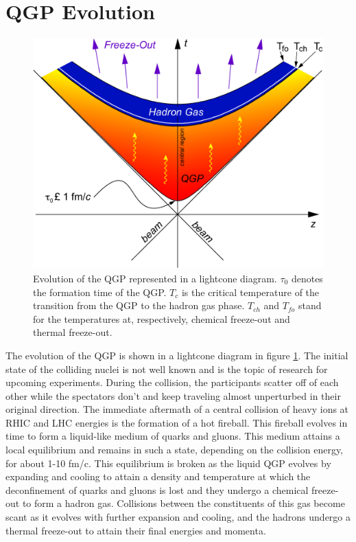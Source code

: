 
\section{QGP Evolution}
\begin{figure}[h]
  \centering
  \includegraphics[width=6.5in]{figures/LightCone1_color-crop_NThesis.pdf}
  \caption{Evolution of the QGP represented in a lightcone diagram. $\tau_{0}$ denotes the formation time of the QGP. $T_{c}$ is the critical temperature of the transition from the QGP to the hadron gas phase. $T_{ch}$ and $T_{fo}$ stand for the temperatures at, respectively, chemical freeze-out and thermal freeze-out. \cite{Connors:2017ptx}}\label{fig:lightcone}
\end{figure}
The evolution of the QGP is shown in a lightcone diagram in figure \ref{fig:lightcone}.
The initial state of the colliding nuclei is not well known and is the topic of research for upcoming experiments. During the collision, the participants scatter off of each other while the spectators don't and keep traveling almost unperturbed in their original direction. The immediate aftermath of a central collision of heavy ions at RHIC and LHC energies is the formation of a hot fireball. This fireball evolves in time to form a liquid-like medium of quarks and gluons. This medium attains a local equilibrium and remains in such a state, depending on the collision energy, for about 1-10 fm/c. This equilibrium is broken as the liquid QGP evolves by expanding and cooling to attain a density and temperature at which the deconfinement of quarks and gluons is lost and they undergo a chemical freeze-out to form a hadron gas. Collisions between the constituents of this gas become scant as it evolves with further expansion and cooling, and the hadrons undergo a thermal freeze-out to attain their final energies and momenta.

